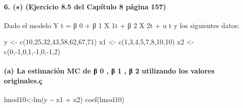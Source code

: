 \documentclass[
]{article}
\newenvironment{Shaded}{\begin{snugshade}}{\end{snugshade}}
\newcommand{\DecValTok}[1]{\textcolor[rgb]{0.00,0.00,0.81}{#1}}
\newcommand{\FunctionTok}[1]{\textcolor[rgb]{0.00,0.00,0.00}{#1}}
\newcommand{\NormalTok}[1]{#1}
\newcommand{\OtherTok}[1]{\textcolor[rgb]{0.56,0.35,0.01}{#1}}
\newcommand{\SpecialCharTok}[1]{\textcolor[rgb]{0.00,0.00,0.00}{#1}}
\begin{document}
\hypertarget{ejercicio-8.5-del-capuxedtulo-8-puxe1gina-157}{%
\paragraph{6. (∗) (Ejercicio 8.5 del Capítulo 8 página
157)}\label{ejercicio-8.5-del-capuxedtulo-8-puxe1gina-157}}

Dado el modelo Y t = β 0 + β 1 X 1t + β 2 X 2t + u t y los siguientes
datos:

\begin{Shaded}
\begin{Highlighting}[]
\NormalTok{y }\OtherTok{\textless{}{-}} \FunctionTok{c}\NormalTok{(}\DecValTok{10}\NormalTok{,}\DecValTok{25}\NormalTok{,}\DecValTok{32}\NormalTok{,}\DecValTok{43}\NormalTok{,}\DecValTok{58}\NormalTok{,}\DecValTok{62}\NormalTok{,}\DecValTok{67}\NormalTok{,}\DecValTok{71}\NormalTok{)}
\NormalTok{x1 }\OtherTok{\textless{}{-}} \FunctionTok{c}\NormalTok{(}\DecValTok{1}\NormalTok{,}\DecValTok{3}\NormalTok{,}\DecValTok{4}\NormalTok{,}\DecValTok{5}\NormalTok{,}\DecValTok{7}\NormalTok{,}\DecValTok{8}\NormalTok{,}\DecValTok{10}\NormalTok{,}\DecValTok{10}\NormalTok{)}
\NormalTok{x2 }\OtherTok{\textless{}{-}} \FunctionTok{c}\NormalTok{(}\DecValTok{0}\NormalTok{,}\SpecialCharTok{{-}}\DecValTok{1}\NormalTok{,}\DecValTok{0}\NormalTok{,}\DecValTok{1}\NormalTok{,}\SpecialCharTok{{-}}\DecValTok{1}\NormalTok{,}\DecValTok{0}\NormalTok{,}\SpecialCharTok{{-}}\DecValTok{1}\NormalTok{,}\DecValTok{2}\NormalTok{)}
\end{Highlighting}
\end{Shaded}

\hypertarget{a-la-estimaciuxf3n-mc-de-ux3b2-0-ux3b2-1-ux3b2-2-utilizando-los-valores-originales.uxe7}{%
\paragraph{(a) La estimación MC de β 0 , β 1 , β 2 utilizando los
valores
originales.ç}\label{a-la-estimaciuxf3n-mc-de-ux3b2-0-ux3b2-1-ux3b2-2-utilizando-los-valores-originales.uxe7}}

\begin{Shaded}
\begin{Highlighting}[]
\NormalTok{lmod10}\OtherTok{\textless{}{-}}\FunctionTok{lm}\NormalTok{(y }\SpecialCharTok{\textasciitilde{}}\NormalTok{ x1 }\SpecialCharTok{+}\NormalTok{ x2)}
\FunctionTok{coef}\NormalTok{(lmod10)}
\end{Highlighting}
\end{Shaded}
\end{document}
